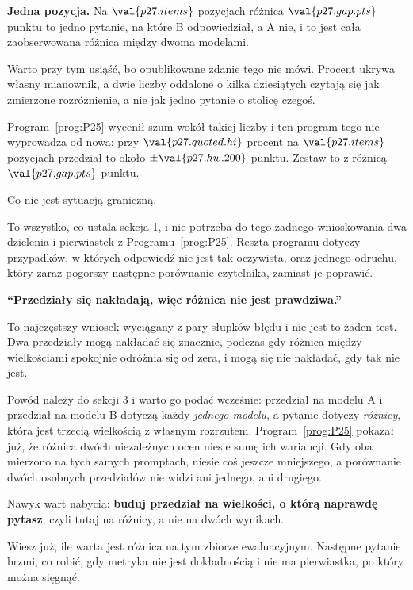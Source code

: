\begin{fr}

\textbf{Jedna pozycja.} Na $\val{p27.items}$ pozycjach różnica
$\val{p27.gap.pts}$ punktu to jedno pytanie, na które B odpowiedział, a A nie,
i to jest cała zaobserwowana różnica między dwoma modelami.

Warto przy tym usiąść, bo opublikowane zdanie tego nie mówi. Procent ukrywa
własny mianownik, a dwie liczby oddalone o kilka dziesiątych czytają się jak
zmierzone rozróżnienie, a nie jak jedno pytanie o stolicę czegoś.

Program~\ref{prog:P25} wycenił szum wokół takiej liczby i ten program tego nie
wyprowadza od nowa: przy $\val{p27.quoted.hi}$ procent na $\val{p27.items}$
pozycjach przedział to około $\pm\val{p27.hw.200}$ punktu. Zestaw to z
różnicą $\val{p27.gap.pts}$ punktu.
\dotline
\nextframe
\end{fr}

\begin{fr}

Co nie jest sytuacją graniczną.


To wszystko, co ustala sekcja 1, i nie potrzeba do tego żadnego wnioskowania
\dash{} dwa dzielenia i pierwiastek z Programu~\ref{prog:P25}. Reszta programu
dotyczy przypadków, w których odpowiedź nie jest tak oczywista, oraz jednego
odruchu, który zaraz pogorszy następne porównanie czytelnika, zamiast je
poprawić.
\end{fr}

\begin{fr}
\begin{trapbox}
\textbf{\enquote{Przedziały się nakładają, więc różnica nie jest prawdziwa.}}

To najczęstszy wniosek wyciągany z pary słupków błędu i nie jest to żaden
test. Dwa przedziały mogą nakładać się znacznie, podczas gdy różnica między
wielkościami spokojnie odróżnia się od zera, i mogą się nie nakładać, gdy tak
nie jest.

Powód należy do sekcji 3 i warto go podać wcześnie: przedział na modelu A i
przedział na modelu B dotyczą każdy \emph{jednego modelu}, a pytanie dotyczy
\emph{różnicy}, która jest trzecią wielkością z własnym rozrzutem.
Program~\ref{prog:P25} pokazał już, że różnica dwóch niezależnych ocen niesie
sumę ich wariancji. Gdy oba mierzono na tych samych promptach, niesie coś
jeszcze mniejszego, a porównanie dwóch osobnych przedziałów nie widzi ani
jednego, ani drugiego.

Nawyk wart nabycia: \textbf{buduj przedział na wielkości, o którą naprawdę
pytasz}, czyli tutaj na różnicy, a nie na dwóch wynikach.
\end{trapbox}

Wiesz już, ile warta jest różnica na tym zbiorze ewaluacyjnym. Następne
pytanie brzmi, co robić, gdy metryka nie jest dokładnością i nie ma
pierwiastka, po który można sięgnąć.
\end{fr}

